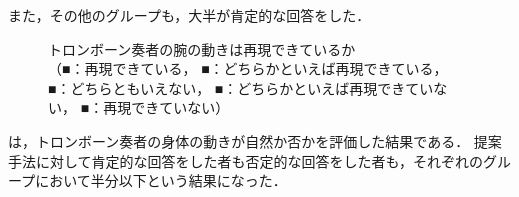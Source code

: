 また，その他のグループも，大半が肯定的な回答をした．
\begin{figure}[!h]
	\centering
	\hspace{5mm}
	\hspace{5mm}
	\caption{トロンボーン奏者の腕の動きは再現できているか\\
		（{\color{legend1}■}：再現できている，
		{\color{legend2}■}：どちらかといえば再現できている，
		{\color{legend3}■}：どちらともいえない，
		{\color{legend4}■}：どちらかといえば再現できていない，
		{\color{legend5}■}：再現できていない）}
	\label{fig:Q1-3}
\end{figure}
\newpage
\par
{}は，トロンボーン奏者の身体の動きが自然か否かを評価した結果である．
提案手法に対して肯定的な回答をした者も否定的な回答をした者も，それぞれのグループにおいて半分以下という結果になった．

